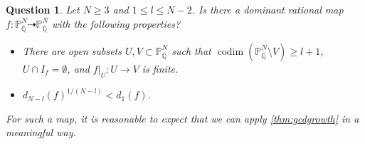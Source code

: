 \documentclass[12pt]{amsart}
\theoremstyle{plain}
\newtheorem{question}[theorem]{Question}
\theoremstyle{definition}
\numberwithin{equation}{section}
\def\P{{\mathbb P}}
\def\QQ{\overline{\mathbb Q}}
\DeclareMathOperator{\codim}{codim}
\begin{document}
\begin{question}
Let $N \geq 3$ and $1 \leq  l \leq N-2 $.
Is there a dominant rational map $f \colon \P^{N}_{\QQ} \dashrightarrow \P^{N}_{\QQ}$
with the following properties?
\begin{itemize}
\item
There are open subsets $U, V \subset \P^{N}_{\QQ}$ such that
$\codim (\P^{N}_{\QQ} \setminus V) \geq l+1$, 
$U \cap I_{f} =  \emptyset$, 
and $f|_{U} \colon U \longrightarrow V$ is finite.

\item
$d_{N-l}(f)^{1/(N-l)} < d_{1}(f)$.
\end{itemize}
For such a map, it is reasonable to expect that we can apply \cref{thm:gcdgrowth}
in a meaningful way.
\end{question}





\end{document}
